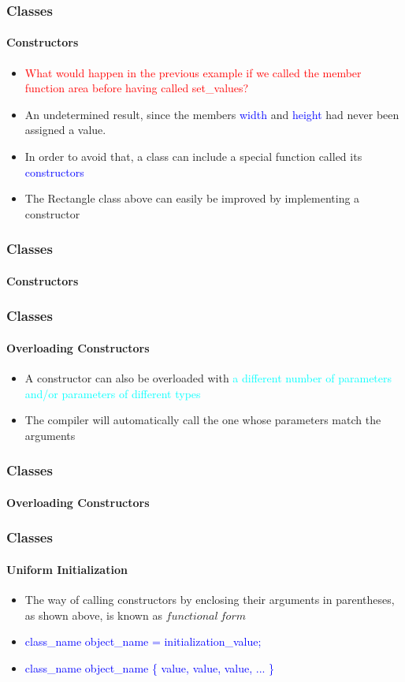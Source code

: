 \documentclass[hyperref={pdfpagelabels=true}]{beamer}
\newcounter{angle}
\begin{document}
\begin{frame}
\frametitle{Classes}
\framesubtitle{Constructors}
\begin{itemize}[<+->]
\item \textcolor{red}{What would happen in the previous example if we called the member function area before having called \textcolor{mygreen}{set\_values?} }
\item An undetermined result, since the members \textcolor{blue}{width} and \textcolor{blue}{height} had never been assigned a value.
\item In order to avoid that, a class can include a special function called its  \textcolor{blue}{constructors}
\item The Rectangle class above can easily be improved by implementing a constructor
\end{itemize}
\end{frame}


\begin{frame}[shrink]
\frametitle{Classes}
\framesubtitle{Constructors}
\begin{tcolorbox}[title= ,width=14.85 cm]
\scriptsize

\end{tcolorbox}
\end{frame}


\begin{frame}
\frametitle{Classes}
\framesubtitle{Overloading Constructors}
\begin{itemize}[<+->]
\item A constructor can also be overloaded with 
 {\textcolor{cyan}{a different number of parameters and/or parameters of different types}}
\item The compiler will automatically call the one whose parameters match the arguments
\end{itemize}
\end{frame}


\begin{frame}[shrink]
\frametitle{Classes}
\framesubtitle{Overloading Constructors}
\begin{tcolorbox}[title= ,width=14.85 cm]
\scriptsize

\end{tcolorbox}
\end{frame}


\begin{frame}[shrink]
\frametitle{Classes}
\framesubtitle{Uniform Initialization}
\begin{itemize}[<+->]
\item The way of calling constructors by enclosing their arguments in parentheses, as shown above, is known as $functional \ form$
\item \textcolor{blue}{class\_name object\_name = initialization\_value;}\\ 
\item \textcolor{blue}{class\_name object\_name \{ value, value, value, ... \}}
\end{itemize}
\pause
\scriptsize

\end{frame}
\end{document}
